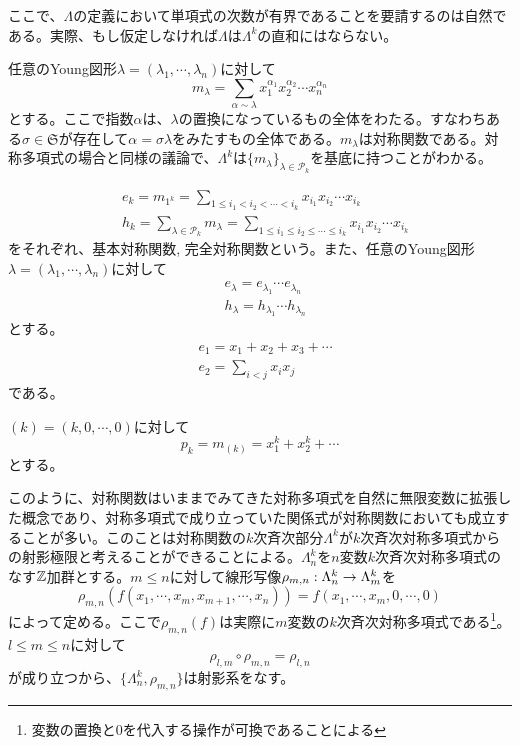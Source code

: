 \documentclass{ltjsreport}
\begin{document}
ここで、$\Lambda$の定義において単項式の次数が有界であることを要請するのは自然である。実際、もし仮定しなければ$\Lambda$は$\Lambda^k$の直和にはならない。

\begin{eg}[単項対称関数]\label{monomial_sym_func}
  任意のYoung図形$\lambda=(\lambda_1,\cdots,\lambda_n)$に対して
  \[
  m_{\lambda}=\sum_{\alpha\sim\lambda}x_1^{\alpha_1}x_2^{\alpha_2}\cdots x_{n}^{\alpha_n}
  \]
  とする。ここで指数$\alpha$は、$\lambda$の置換になっているもの全体をわたる。すなわちある$\sigma\in\mathfrak{S}$が存在して$\alpha=\sigma\lambda$をみたすもの全体である。$m_\lambda$は対称関数である。対称多項式の場合と同様の議論で、$\Lambda^k$は$\{m_\lambda\}_{\lambda\in\mathcal{P}_k}$を基底に持つことがわかる。
\end{eg}

\begin{eg}\label{elementary_func}
  \begin{align*}
  &e_k=m_{1^k}
  =\sum_{1\leq i_1<i_2<\cdots<i_k}x_{i_1}x_{i_2}\cdots x_{i_k}\\
  &h_k=\sum_{\lambda\in\mathcal{P}_k} m_\lambda
  =\sum_{1\leq i_1\leq i_2\leq \cdots\leq i_k}x_{i_1}x_{i_2}\cdots x_{i_k}
  \end{align*}
  をそれぞれ、基本対称関数, 完全対称関数という。また、任意のYoung図形$\lambda=(\lambda_1,\cdots,\lambda_n)$に対して
  \begin{align*}
    &e_\lambda=e_{\lambda_1}\cdots e_{\lambda_n}\\
    &h_\lambda=h_{\lambda_1}\cdots h_{\lambda_n}
  \end{align*}
  とする。
  \begin{align*}
    &e_1=x_1+x_2+x_3+\cdots\\
    &e_2=\sum_{i<j}x_ix_j
  \end{align*}
  である。
\end{eg}

\begin{eg}[べき和対称関数]\label{power_func}
  $(k)=(k,0,\cdots,0)$に対して
  \[
  p_{k}=m_{(k)}=x_1^k+x_2^k+\cdots
  \]
  とする。
\end{eg}

このように、対称関数はいままでみてきた対称多項式を自然に無限変数に拡張した概念であり、対称多項式で成り立っていた関係式が対称関数においても成立することが多い。このことは対称関数の$k$次斉次部分$\Lambda^k$が$k$次斉次対称多項式からの射影極限と考えることができることによる。$\Lambda_n^k$を$n$変数$k$次斉次対称多項式のなす$\mathbb{Z}$加群とする。$m\leq n$に対して線形写像$\rho_{m,n}:\Lambda^k_n\rightarrow\Lambda^k_m$を
\[
\rho_{m,n}(f(x_1,\cdots,x_m,x_{m+1},\cdots,x_n))=f(x_1,\cdots,x_m,0,\cdots,0)  
\]
によって定める。ここで$\rho_{m,n}(f)$は実際に$m$変数の$k$次斉次対称多項式である\footnote{変数の置換と$0$を代入する操作が可換であることによる}。$l\leq m\leq n$に対して
\[
\rho_{l,m}\circ\rho_{m,n}=\rho_{l,n}  
\]
が成り立つから、$\{\Lambda^k_n,\rho_{m,n}\}$は射影系をなす。
\end{document}
